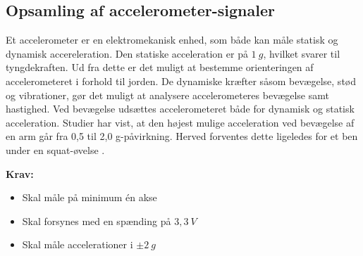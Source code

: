 \subsection{Opsamling af accelerometer-signaler}
Et accelerometer er en elektromekanisk enhed, som både kan måle statisk og dynamisk accereleration. Den statiske acceleration er på $1~g$, hvilket svarer til tyngdekraften. Ud fra dette er det muligt at bestemme orienteringen af accelerometeret i forhold til jorden. De dynamiske kræfter såsom bevægelse, stød og vibrationer, gør det muligt at analysere accelerometeres bevægelse samt hastighed. Ved bevægelse udsættes accelerometeret både for dynamisk og statisk acceleration. Studier har vist, at den højest mulige acceleration ved bevægelse af en arm går fra 0,5 til 2,0 g-påvirkning. Herved forventes dette ligeledes for et ben under en squat-øvelse \citep{bernmarka2002}. 

\vspace{3mm}

\textbf{Krav:}
\begin{itemize}
\item Skal måle på minimum én akse
\item Skal forsynes med en spænding på $3,3~V$
\item Skal måle accelerationer i $\pm2~g$
\end{itemize}
